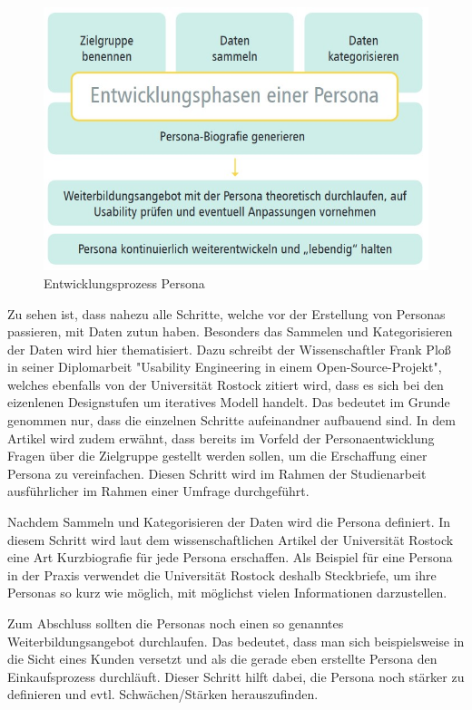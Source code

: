 \begin{figure}[h]
    \centering
    \includegraphics[width=1\textwidth]{images/03/entwicklungPersona.jpg}
    \caption{Entwicklungsprozess Persona \cite{personamethode}}
\end{figure}

Zu sehen ist, dass nahezu alle Schritte, welche vor der Erstellung von Personas passieren, mit Daten zutun haben. Besonders das Sammelen und Kategorisieren der Daten wird hier thematisiert.\cite{personamethode} Dazu schreibt der Wissenschaftler Frank Ploß in seiner Diplomarbeit "Usability Engineering in einem Open-Source-Projekt", welches ebenfalls von der Universität Rostock zitiert wird, dass es sich bei den eizenlenen Designstufen um iteratives Modell handelt.\cite{osp:masterthesis}
Das bedeutet im Grunde genommen nur, dass die einzelnen Schritte aufeinandner aufbauend sind. In dem Artikel wird zudem erwähnt, dass bereits im Vorfeld der Personaentwicklung Fragen über die Zielgruppe gestellt werden sollen, um die Erschaffung einer Persona zu vereinfachen.\cite{personamethode}
Diesen Schritt wird im Rahmen der Studienarbeit ausführlicher im Rahmen einer Umfrage durchgeführt.

Nachdem Sammeln und Kategorisieren der Daten wird die Persona definiert.\cite{personamethode} In diesem Schritt wird laut dem wissenschaftlichen Artikel der Universität Rostock eine Art Kurzbiografie für jede Persona erschaffen.\cite{personamethode} Als Beispiel für eine Persona in der Praxis verwendet die Universität Rostock deshalb Steckbriefe, um ihre Personas so kurz wie möglich, mit möglichst vielen Informationen darzustellen.\cite{personamethode}

Zum Abschluss sollten die Personas noch einen so genanntes Weiterbildungsangebot durchlaufen. Das bedeutet, dass man sich beispielsweise in die Sicht eines Kunden versetzt und als die gerade eben erstellte Persona den Einkaufsprozess durchläuft.\cite{personamethode} Dieser Schritt hilft dabei, die Persona noch stärker zu definieren und evtl. Schwächen/Stärken herauszufinden.

